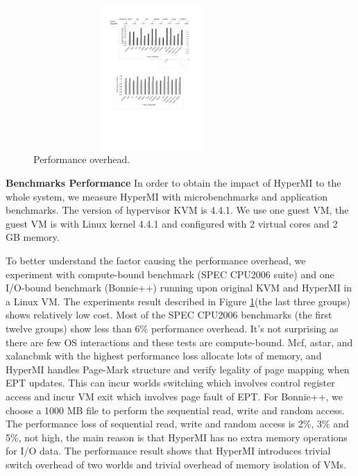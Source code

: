 \documentclass[conference]{IEEEtran}
\begin{document}
\begin{figure}
\centerline{\includegraphics[width=9cm,height=5.5cm]{performance.pdf}}
\caption{Performance overhead.} \label{fig5}
\end{figure}

\textbf{Benchmarks Performance}
In order to obtain the impact of HyperMI to the whole system, we measure HyperMI with microbenchmarks and application benchmarks. 
The version of hypervisor KVM is 4.4.1. We use one guest VM, the guest VM is with Linux kernel 4.4.1 and configured with 2 virtual cores and 2 GB memory. 

To better understand the factor causing the performance overhead, we experiment with compute-bound benchmark (SPEC CPU2006 suite) and one I/O-bound benchmark (Bonnie++) running upon original KVM and HyperMI in a Linux VM. The experiments result described in Figure \ref{fig5}(the last three groups) shows relatively low cost. Most of the SPEC CPU2006 benchmarks (the first twelve groups) show less than 6\% performance overhead. It's not surprising as there are few OS interactions and these tests are compute-bound. Mcf, astar, and xalancbmk with the highest performance loss allocate lots of memory, and HyperMI handles Page-Mark structure and verify legality of page mapping when EPT updates. This can incur worlds switching which involves control register access and incur VM exit which involves page fault of EPT.
 For Bonnie++, we choose a 1000 MB file to perform the sequential read, write and random access. The performance loss of sequential read, write and random access is 2\%, 3\% and 5\%, not high, the main reason is that HyperMI has no extra memory operations for I/O data. The performance result shows that HyperMI introduces trivial switch overhead of two worlds and trivial overhead of memory isolation of VMs.
\end{document}
